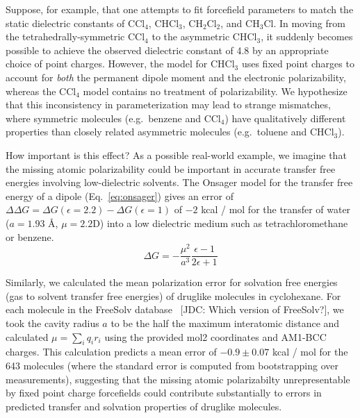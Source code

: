 \documentclass[aps,pre,twocolumn,nofootinbib,superscriptaddress,linenumbers]{revtex4-1}
\begin{document}
Suppose, for example, that one attempts to fit forcefield parameters to match the static dielectric constants of $\mathrm{CCl_4}$, $\mathrm{CHCl_3}$, $\mathrm{CH_2Cl_2}$, and $\mathrm{CH_3Cl}$.
In moving from the tetrahedrally-symmetric $\mathrm{CCl_4}$ to the asymmetric $\mathrm{CHCl_3}$, it suddenly becomes possible to achieve the observed dielectric constant of 4.8 by an appropriate choice of point charges.
However, the model for $\mathrm{CHCl_3}$ uses fixed point charges to account for \emph{both} the permanent dipole moment and the electronic polarizability, whereas the $\mathrm{CCl_4}$ model contains no treatment of polarizability.  
We hypothesize that this inconsistency in parameterization may lead to strange mismatches, where symmetric molecules (e.g.~benzene and $\mathrm{CCl_4}$) have qualitatively different properties than closely related asymmetric molecules (e.g.~toluene and $\mathrm{CHCl_3}$).

How important is this effect?
As a possible real-world example, we imagine that the missing atomic polarizability could be important in accurate transfer free energies involving low-dielectric solvents.  
The Onsager model for the transfer free energy of a dipole (Eq.~\ref{eq:onsager}) gives an error of $\Delta \Delta G = \Delta G(\epsilon=2.2) - \Delta G(\epsilon=1)$ of $-2$ kcal / mol for the transfer of water ($a = 1.93$ \AA, $\mu = 2.2$D) into a low dielectric medium such as tetrachloromethane or benzene.  
\begin{equation} \label{eq:onsager}
\Delta G = -\frac{\mu^2}{a^3}\frac{\epsilon - 1}{2 \epsilon + 1}
\end{equation}

Similarly, we calculated the mean polarization error for solvation free energies (gas to solvent transfer free energies) of druglike molecules in cyclohexane.  
For each molecule in the FreeSolv database~\cite{freesolv} {\color{red}[JDC: Which version of FreeSolv?]}, we took the cavity radius $a$ to be the half the maximum interatomic distance and calculated $\mu = \sum_i q_i r_i$ using the provided mol2 coordinates and AM1-BCC charges.  
This calculation predicts a mean error of $-0.9\pm0.07$ kcal / mol for the 643 molecules (where the standard error is computed from bootstrapping over measurements), suggesting that the missing atomic polarizabilty unrepresentable by fixed point charge forcefields could contribute substantially to errors in predicted transfer and solvation properties of druglike molecules.  
\end{document}
